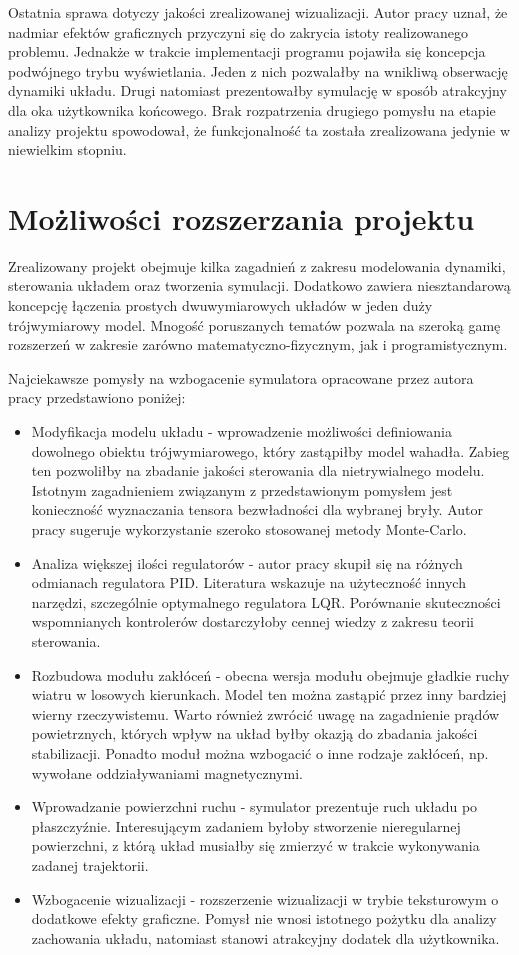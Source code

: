 \documentclass[12pt, oneside]{report}
\theoremstyle{definition}
\begin{document}
Ostatnia sprawa dotyczy jakości zrealizowanej wizualizacji. Autor pracy uznał, że nadmiar efektów graficznych przyczyni się do zakrycia istoty realizowanego problemu. Jednakże w trakcie implementacji programu pojawiła się koncepcja podwójnego trybu wyświetlania. Jeden z nich pozwalałby na wnikliwą obserwację dynamiki układu. Drugi natomiast prezentowałby symulację w sposób atrakcyjny dla oka użytkownika końcowego. Brak rozpatrzenia drugiego pomysłu na etapie analizy projektu spowodował, że funkcjonalność ta została zrealizowana jedynie w niewielkim stopniu.

\section{Możliwości rozszerzania projektu}
Zrealizowany projekt obejmuje kilka zagadnień z zakresu modelowania dynamiki, sterowania układem oraz tworzenia symulacji. Dodatkowo zawiera niesztandarową koncepcję łączenia prostych dwuwymiarowych układów w jeden duży trójwymiarowy model. Mnogość poruszanych tematów pozwala na szeroką gamę rozszerzeń w zakresie zarówno matematyczno-fizycznym, jak i programistycznym.

Najciekawsze pomysły na wzbogacenie symulatora opracowane przez autora pracy przedstawiono poniżej:
\begin{itemize}
\item Modyfikacja modelu układu - wprowadzenie możliwości definiowania dowolnego obiektu trójwymiarowego, który zastąpiłby model wahadła. Zabieg ten pozwoliłby na zbadanie jakości sterowania dla nietrywialnego modelu. Istotnym zagadnieniem związanym z przedstawionym pomysłem jest konieczność wyznaczania tensora bezwładności dla wybranej bryły. Autor pracy sugeruje wykorzystanie szeroko stosowanej metody Monte-Carlo.
\item Analiza większej ilości regulatorów - autor pracy skupił się na różnych odmianach regulatora PID. Literatura wskazuje na użyteczność innych narzędzi, szczególnie optymalnego regulatora LQR. Porównanie skuteczności wspomnianych kontrolerów dostarczyłoby cennej wiedzy z zakresu teorii sterowania.
\item Rozbudowa modułu zakłóceń - obecna wersja modułu obejmuje gładkie ruchy wiatru w losowych kierunkach. Model ten można zastąpić przez inny bardziej wierny rzeczywistemu. Warto również zwrócić uwagę na zagadnienie prądów powietrznych, których wpływ na układ byłby okazją do zbadania jakości stabilizacji. Ponadto moduł można wzbogacić o inne rodzaje zakłóceń, np. wywołane oddziaływaniami magnetycznymi.
\item Wprowadzanie powierzchni ruchu - symulator prezentuje ruch układu po płaszczyźnie. Interesującym zadaniem byłoby stworzenie nieregularnej powierzchni, z którą układ musiałby się zmierzyć w trakcie wykonywania zadanej trajektorii.
\item Wzbogacenie wizualizacji - rozszerzenie wizualizacji w trybie teksturowym o dodatkowe efekty graficzne. Pomysł nie wnosi istotnego pożytku dla analizy zachowania układu, natomiast stanowi atrakcyjny dodatek dla użytkownika.
\end{itemize} 
\end{document}
